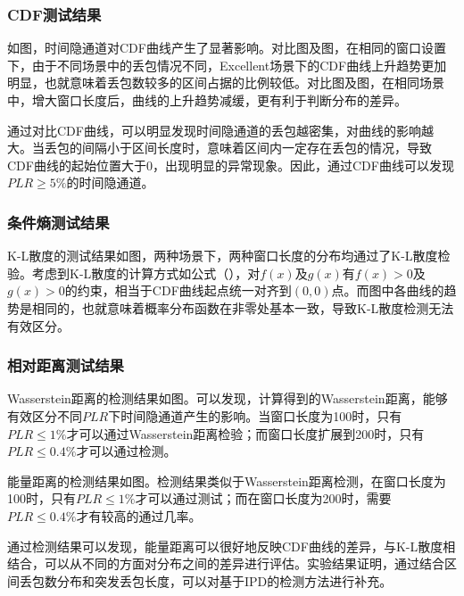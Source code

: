 \subsubsection{CDF测试结果}
\label{chap:analyze:result:window:cdf}

如图，时间隐通道对CDF曲线产生了显著影响。对比图及图，在相同的窗口设置下，由于不同场景中的丢包情况不同，Excellent场景下的CDF曲线上升趋势更加明显，也就意味着丢包数较多的区间占据的比例较低。对比图及图，在相同场景中，增大窗口长度后，曲线的上升趋势减缓，更有利于判断分布的差异。

通过对比CDF曲线，可以明显发现时间隐通道的丢包越密集，对曲线的影响越大。当丢包的间隔小于区间长度时，意味着区间内一定存在丢包的情况，导致CDF曲线的起始位置大于0，出现明显的异常现象。因此，通过CDF曲线可以发现$PLR\ge5\%$的时间隐通道。

\subsubsection{条件熵测试结果}
\label{chap:analyze:result:window:kld}

K-L散度的测试结果如图，两种场景下，两种窗口长度的分布均通过了K-L散度检验。考虑到K-L散度的计算方式如公式（），对$f(x)$及$g(x)$有$f(x)>0$及$g(x)>0$的约束，相当于CDF曲线起点统一对齐到$(0,0)$点。而图中各曲线的趋势是相同的，也就意味着概率分布函数在非零处基本一致，导致K-L散度检测无法有效区分。

\subsubsection{相对距离测试结果}
\label{chap:analyze:result:window:distance}

Wasserstein距离的检测结果如图。可以发现，计算得到的Wasserstein距离，能够有效区分不同$PLR$下时间隐通道产生的影响。当窗口长度为100时，只有$PLR\le 1\%$才可以通过Wasserstein距离检验；而窗口长度扩展到200时，只有$PLR\le 0.4\%$才可以通过检测。

能量距离的检测结果如图。检测结果类似于Wasserstein距离检测，在窗口长度为100时，只有$PLR\le 1\%$才可以通过测试；而在窗口长度为200时，需要$PLR\le 0.4\%$才有较高的通过几率。

通过检测结果可以发现，能量距离可以很好地反映CDF曲线的差异，与K-L散度相结合，可以从不同的方面对分布之间的差异进行评估。实验结果证明，通过结合区间丢包数分布和突发丢包长度，可以对基于IPD的检测方法进行补充。


